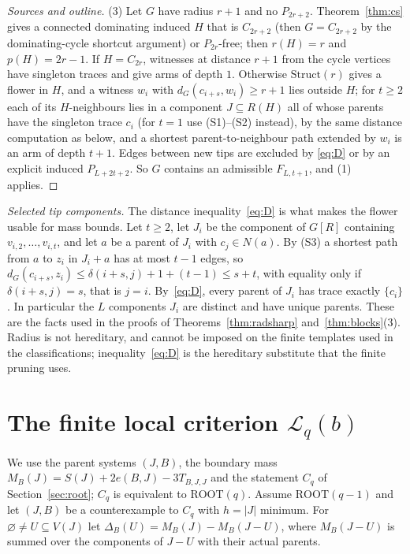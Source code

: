 \documentclass[11pt]{amsart}
\theoremstyle{definition}
\theoremstyle{remark}
\newcommand{\pp}{p}
\newcommand{\ROOT}{\mathrm{ROOT}}
\begin{document}
\begin{proof}[Sources and outline]
(3) Let $G$ have radius $r+1$ and no $P_{2r+2}$. Theorem~\ref{thm:cs} gives a connected dominating induced $H$ that is $C_{2r+2}$ (then $G=C_{2r+2}$ by the dominating-cycle shortcut argument) or $P_{2r}$-free; then $r(H)=r$ and $\pp(H)=2r-1$. If $H=C_{2r}$, witnesses at distance $r+1$ from the cycle vertices have singleton traces and give arms of depth $1$. Otherwise $\mathrm{Struct}(r)$ gives a flower in $H$, and a witness $w_i$ with $d_G(c_{i+s},w_i)\ge r+1$ lies outside $H$; for $t\ge2$ each of its $H$-neighbours lies in a component $J\subseteq R(H)$ all of whose parents have the singleton trace $c_i$ (for $t=1$ use (S1)--(S2) instead), by the same distance computation as below, and a shortest parent-to-neighbour path extended by $w_i$ is an arm of depth $t+1$. Edges between new tips are excluded by \eqref{eq:D} or by an explicit induced $P_{L+2t+2}$. So $G$ contains an admissible $F_{L,t+1}$, and (1) applies.
\end{proof}

\emph{Selected tip components.} The distance inequality~\eqref{eq:D} is what makes the flower usable for mass bounds. Let $t\ge2$, let $J_i$ be the component of $G[R]$ containing $v_{i,2},\dots,v_{i,t}$, and let $a$ be a parent of $J_i$ with $c_j\in N(a)$. By (S3) a shortest path from $a$ to $z_i$ in $J_i+a$ has at most $t-1$ edges, so $d_G(c_{i+s},z_i)\le\delta(i+s,j)+1+(t-1)\le s+t$, with equality only if $\delta(i+s,j)=s$, that is $j=i$. By~\eqref{eq:D}, every parent of $J_i$ has trace exactly $\{c_i\}$. In particular the $L$ components $J_i$ are distinct and have unique parents. These are the facts used in the proofs of Theorems~\ref{thm:radsharp} and~\ref{thm:blocks}(3). Radius is not hereditary, and cannot be imposed on the finite templates used in the classifications; inequality~\eqref{eq:D} is the hereditary substitute that the finite pruning uses.

\section{The finite local criterion \texorpdfstring{$\mathcal L_q(b)$}{Lq(b)}}\label{app:Lq}

We use the parent systems $(J,B)$, the boundary mass $M_B(J)=S(J)+2e(B,J)-3T_{B,J,J}$ and the statement $C_q$ of Section~\ref{sec:root}; $C_q$ is equivalent to $\ROOT(q)$. Assume $\ROOT(q-1)$ and let $(J,B)$ be a counterexample to $C_q$ with $h=|J|$ minimum. For $\varnothing\ne U\subseteq V(J)$ let $\Delta_B(U)=M_B(J)-M_B(J-U)$, where $M_B(J-U)$ is summed over the components of $J-U$ with their actual parents.
\end{document}
